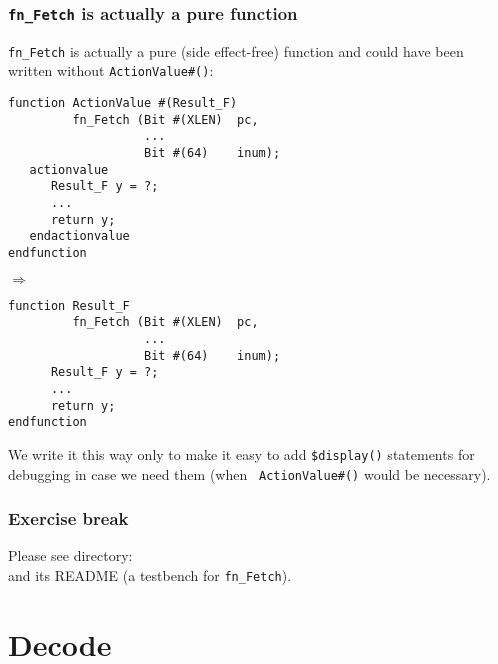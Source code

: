 \begin{frame}[fragile]
\frametitle{{\tt fn\_Fetch} is actually a pure function}

\footnotesize

{\tt fn\_Fetch} is actually a pure (side effect-free) function and
could have been written without {\tt ActionValue\#()}:

\vspace{2ex}

\begin{minipage}{0.45\textwidth}
 \begin{Verbatim}[frame=single]
function ActionValue #(Result_F)
         fn_Fetch (Bit #(XLEN)  pc,
                   ...
                   Bit #(64)    inum);
   actionvalue
      Result_F y = ?;
      ...
      return y;
   endactionvalue
endfunction
 \end{Verbatim}
\end{minipage}
\hfill
$\Longrightarrow$
\hfill
\begin{minipage}{0.45\textwidth}
 \begin{Verbatim}[frame=single]
function Result_F
         fn_Fetch (Bit #(XLEN)  pc,
                   ...
                   Bit #(64)    inum);
      Result_F y = ?;
      ...
      return y;
endfunction
 \end{Verbatim}
\end{minipage}

\vspace{2ex}

We write it this way only to make it easy to add {\tt \$display()}
statements for debugging in case we need them (when {\tt
ActionValue\#()} would be necessary).

\end{frame}


\begin{frame}
\frametitle{\EmojiExercise \hmm Exercise break}

Please see directory:  \\
and its README (a testbench for {\tt fn\_Fetch}).

\end{frame}


\section{Decode}

